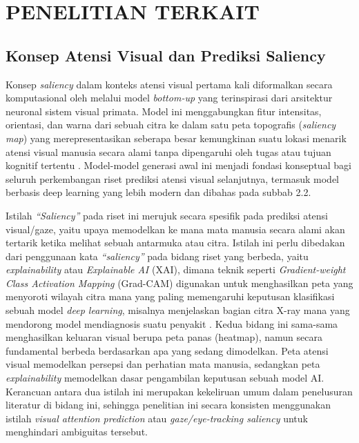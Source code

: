 \chapter{PENELITIAN TERKAIT}

\section{Konsep Atensi Visual dan Prediksi Saliency}


Konsep \textit{saliency} dalam konteks atensi visual pertama kali diformalkan secara komputasional oleh \citet{itti1998model} melalui model \textit{bottom-up} yang terinspirasi dari arsitektur neuronal sistem visual primata. Model ini menggabungkan fitur intensitas, orientasi, dan warna dari sebuah citra ke dalam satu peta topografis (\textit{saliency map}) yang merepresentasikan seberapa besar kemungkinan suatu lokasi menarik atensi visual manusia secara alami tanpa dipengaruhi oleh tugas atau tujuan kognitif tertentu \citep{itti1998model}. Model-model generasi awal ini menjadi fondasi konseptual bagi seluruh perkembangan riset prediksi atensi visual selanjutnya, termasuk model berbasis deep learning yang lebih modern dan dibahas pada subbab 2.2.

Istilah \textit{``Saliency''} pada riset ini merujuk secara spesifik pada prediksi atensi visual/gaze, yaitu upaya memodelkan ke mana mata manusia secara alami akan tertarik ketika melihat sebuah antarmuka atau citra. Istilah ini perlu dibedakan dari penggunaan kata \textit{``saliency''} pada bidang riset yang berbeda, yaitu \textit{explainability} atau \textit{Explainable AI} (XAI), dimana teknik seperti \textit{Gradient-weight Class Activation Mapping} (Grad-CAM) digunakan untuk menghasilkan peta yang menyoroti wilayah citra mana yang paling memengaruhi keputusan klasifikasi sebuah model \textit{deep learning}, misalnya menjelaskan bagian citra X-ray mana yang mendorong model mendiagnosis suatu penyakit \citep{selvaraju2017grad}. Kedua bidang ini sama-sama menghasilkan keluaran visual berupa peta panas (heatmap), namun secara fundamental berbeda berdasarkan apa yang sedang dimodelkan. Peta atensi visual memodelkan persepsi dan perhatian mata manusia, sedangkan peta \textit{explainability} memodelkan dasar pengambilan keputusan sebuah model AI. Kerancuan antara dua istilah ini merupakan kekeliruan umum dalam penelusuran literatur di bidang ini, sehingga penelitian ini secara konsisten menggunakan istilah \textit{visual attention prediction} atau \textit{gaze/eye-tracking saliency} untuk menghindari ambiguitas tersebut.

